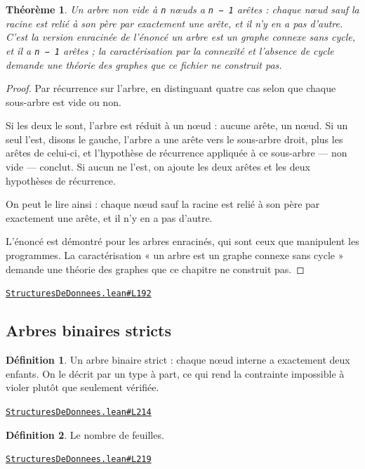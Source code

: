\documentclass[11pt,a4paper]{article}
\theoremstyle{definition}
\newtheorem{definition}{Définition}
\theoremstyle{plain}
\newtheorem{theoreme}{Théorème}
\newcommand{\source}[2]{\par\smallskip\noindent\hfill{\footnotesize\href{#1}{\texttt{#2}}}\par\smallskip}
\begin{document}
\begin{theoreme}
Un arbre non vide à \texttt{n} nœuds a \texttt{n − 1} arêtes : chaque nœud sauf la racine est
relié à son père par exactement une arête, et il n'y en a pas d'autre. C'est la
version enracinée de l'énoncé \og{} un arbre est un graphe connexe sans cycle, et il a
\texttt{n − 1} arêtes \fg{} ; la caractérisation par la connexité et l'absence de cycle demande
une théorie des graphes que ce fichier ne construit pas.
\end{theoreme}
\begin{proof}
Par récurrence sur l'arbre, en distinguant quatre cas selon que chaque sous-arbre est
vide ou non.

Si les deux le sont, l'arbre est réduit à un nœud : aucune arête, un nœud. Si un seul
l'est, disons le gauche, l'arbre a une arête vers le sous-arbre droit, plus les arêtes
de celui-ci, et l'hypothèse de récurrence appliquée à ce sous-arbre — non vide —
conclut. Si aucun ne l'est, on ajoute les deux arêtes et les deux hypothèses de
récurrence.

On peut le lire ainsi : chaque nœud sauf la racine est relié à son père par exactement
une arête, et il n'y en a pas d'autre.

L'énoncé est démontré pour les arbres enracinés, qui sont ceux que manipulent les
programmes. La caractérisation « un arbre est un graphe connexe sans cycle » demande une
théorie des graphes que ce chapitre ne construit pas.
\end{proof}
\source{https://github.com/Commutator-IO/learn-lean/blob/main/courses/02-lycee/11-informatique-nsi/StructuresDeDonnees.lean\#L192}{StructuresDeDonnees.lean\#L192}

\subsection{Arbres binaires stricts}

\begin{definition}
Un arbre binaire strict : chaque nœud interne a exactement deux enfants. On le
décrit par un type à part, ce qui rend la contrainte impossible à violer plutôt que
seulement vérifiée.
\end{definition}
\source{https://github.com/Commutator-IO/learn-lean/blob/main/courses/02-lycee/11-informatique-nsi/StructuresDeDonnees.lean\#L214}{StructuresDeDonnees.lean\#L214}

\begin{definition}
Le nombre de feuilles.
\end{definition}
\source{https://github.com/Commutator-IO/learn-lean/blob/main/courses/02-lycee/11-informatique-nsi/StructuresDeDonnees.lean\#L219}{StructuresDeDonnees.lean\#L219}
\end{document}

